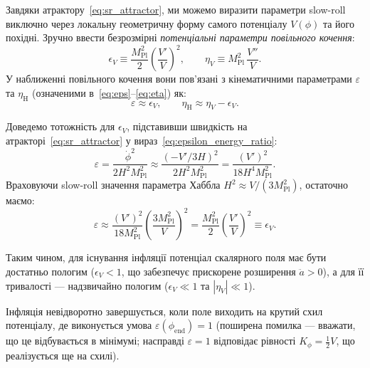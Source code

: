 
Завдяки атрактору~\eqref{eq:sr_attractor}, ми можемо виразити параметри slow-roll виключно через локальну геометричну форму самого потенціалу $V(\phi)$ та його похідні. Зручно ввести безрозмірні \emph{потенціальні параметри повільного кочення}:
\begin{equation}\label{eq:slow_roll_pot}
  \epsilon_V \equiv \frac{M_\mathrm{Pl}^2}{2}\left(\frac{V'}{V}\right)^2,
  \qquad
  \eta_V \equiv M_\mathrm{Pl}^2\,\frac{V''}{V}.
\end{equation}
У наближенні повільного кочення вони пов'язані з кінематичними параметрами $\varepsilon$ та $\eta_{\mathrm{H}}$ (означеними в~\eqref{eq:eps}--\eqref{eq:eta}) як:
\begin{equation}\label{eq:eps_eta_V}
  \varepsilon \approx \epsilon_V,
  \qquad
  \eta_{\mathrm{H}} \approx \eta_V - \epsilon_V.
\end{equation}

Доведемо тотожність для $\epsilon_V$, підставивши швидкість на атракторі~\eqref{eq:sr_attractor} у вираз~\eqref{eq:epsilon_energy_ratio}:
\begin{equation*}
  \varepsilon = \frac{\dot\phi^2}{2H^2 M_\mathrm{Pl}^2} \approx \frac{(-V'/3H)^2}{2H^2 M_\mathrm{Pl}^2} = \frac{(V')^2}{18 H^4 M_\mathrm{Pl}^2}.
\end{equation*}
Враховуючи slow-roll значення параметра Хаббла $H^2 \approx V / (3M_\mathrm{Pl}^2)$, остаточно маємо:
\begin{equation*}
  \varepsilon \approx \frac{(V')^2}{18 M_\mathrm{Pl}^2} \left( \frac{3M_\mathrm{Pl}^2}{V} \right)^2 = \frac{M_\mathrm{Pl}^2}{2}\left(\frac{V'}{V}\right)^2 \equiv \epsilon_V.
\end{equation*}

Таким чином, для існування інфляції потенціал скалярного поля має бути достатньо пологим ($\epsilon_V < 1$, що забезпечує прискорене розширення $\ddot{a} > 0$), а для її тривалості --- надзвичайно пологим ($\epsilon_V \ll 1$ та $|\eta_V| \ll 1$).

Інфляція невідворотно завершується, коли поле виходить на крутий схил потенціалу, де виконується умова $\varepsilon(\phi_{\mathrm{end}}) = 1$ (поширена помилка --- вважати, що це відбувається в мінімумі; насправді $\varepsilon = 1$ відповідає рівності $K_\phi = \frac{1}{2}V$, що реалізується ще на схилі).

